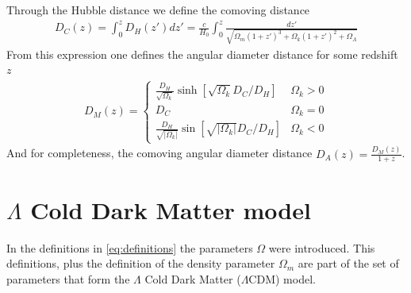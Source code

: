 Through the Hubble distance we define the comoving distance 
\begin{align}
	D_C(z) = \int_{0}^{z} D_H(z') dz' = \frac{c}{H_0}\int_{0}^{z} \frac{dz'}{\sqrt{\Omega_m(1+z')^3 + \Omega_k(1+z')^2 + \Omega_\Lambda} } 
\end{align}
From this expression one defines the angular diameter distance for some redshift $z$
\begin{align}
	D_M(z) = \begin{cases}
		\frac{D_H}{ \sqrt{\Omega_k} }\sinh \left[ \sqrt{\Omega_k} D_C /D_H \right]  	 &\Omega_k >0\\
		D_C& \Omega_k =  0\\
		\frac{D_H}{\sqrt{|\Omega_k|}} \sin \left[ \sqrt{|\Omega_k|} D_C /D_H \right]  	 &\Omega_k <0
		\label{eq:DA-definition}
	\end{cases}
\end{align}
And for completeness, the comoving angular diameter distance $D_A(z) = \frac{D_M(z) }{1+z}$.

\section{$\Lambda$ Cold Dark Matter model}
\label{sec:LCDM}

In the definitions in \eqref{eq:definitions} the parameters $\Omega$ were introduced. This definitions, plus the definition of the density parameter $\Omega_m$ are part of the set of parameters that form the $\Lambda$ Cold Dark Matter ($\Lambda$CDM) model. \\

